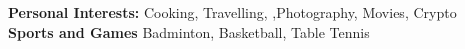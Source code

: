 
\begin{cvparagraph}
\textbf{Personal Interests:} Cooking, Travelling, ,Photography, Movies, Crypto \vspace{0.2cm}\\
\textbf{Sports and Games} Badminton, Basketball, Table Tennis \vspace{0.2cm}\\
\end{cvparagraph}

